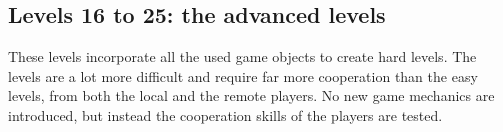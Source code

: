 		\subsection{Levels 16 to 25: the advanced levels}
			These levels incorporate all the used game objects to create hard
			levels. The levels are a lot more difficult and require
			far more cooperation than the easy levels, from both the local
			and the remote players. No new game mechanics are introduced, but
			instead the cooperation skills of the players are tested.